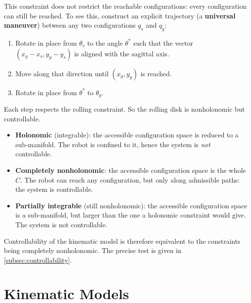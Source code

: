 This constraint does not restrict the reachable configurations: every
configuration can still be reached. To see this, construct an explicit
trajectory (a \textbf{universal maneuver}) between any two
configurations \( q_s \) and \( q_g \):
\begin{enumerate}
    \item Rotate in place from \( \theta_s \) to the angle
          \( \theta^* \) such that the vector
          \( (x_g - x_s, y_g - y_s) \) is aligned with the sagittal
          axis.
    \item Move along that direction until \( (x_g, y_g) \) is reached.
    \item Rotate in place from \( \theta^* \) to \( \theta_g \).
\end{enumerate}
Each step respects the rolling constraint. So the rolling disk is
nonholonomic but controllable.

\begin{nb}
\begin{itemize}
    \item \textbf{Holonomic} (integrable): the accessible
          configuration space is reduced to a sub-manifold. The robot
          is confined to it, hence the system is \emph{not}
          controllable.
    \item \textbf{Completely nonholonomic}: the accessible
          configuration space is the whole \( C \). The robot can
          reach any configuration, but only along admissible paths:
          the system is controllable.
    \item \textbf{Partially integrable} (still nonholonomic): the
          accessible configuration space is a sub-manifold, but larger
          than the one a holonomic constraint would give. The system
          is not controllable.
\end{itemize}
Controllability of the kinematic model is therefore equivalent to the
constraints being completely nonholonomic. The precise test is given in
\cref{subsec:controllability}.
\end{nb}

\section{Kinematic Models}
\label{sec:kinematic-models}

